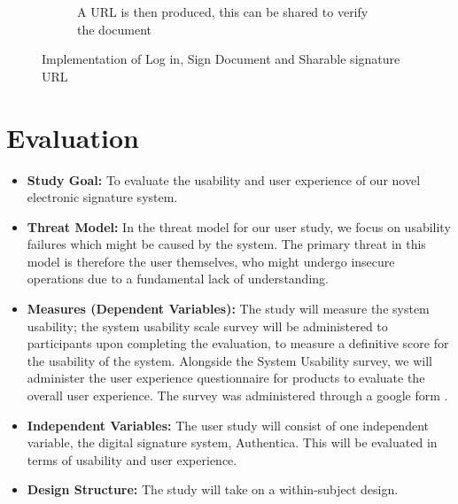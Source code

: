 \documentclass[a4,12pt]{article}
\begin{document}
\begin{figure}[htb]
\begin{subfigure}[b]{0.3\textwidth}
        \caption{A URL is then produced, this can be shared to verify the document}
    \end{subfigure}
    \caption{Implementation of Log in, Sign Document and Sharable signature URL}
    \label{fig:model}
\end{figure}


\section*{Evaluation}

\begin{itemize}[leftmargin=*, label={}]

\setlength\itemsep{0em}

\item \textbf{Study Goal:} To evaluate the usability and user experience of our novel electronic signature system.

\item \textbf{Threat Model:} In the threat model for our user study, we focus on usability failures which might be caused by the system. The primary threat in this model is therefore the user themselves, who might undergo insecure operations due to a fundamental lack of understanding.

\item \textbf{Measures (Dependent Variables):} The study will measure the system usability; the system usability scale survey will be administered to participants upon completing the evaluation, to measure a definitive score for the usability of the system. Alongside the System Usability survey, we will administer the user experience questionnaire for products to evaluate the overall user experience. The survey was administered through a google form \cite{gform}. %

\item \textbf{Independent Variables:} The user study will consist of one independent variable, the digital signature system, Authentica. This will be evaluated in terms of usability and user experience.

\item \textbf{Design Structure:} The study will take on a within-subject design.


\end{itemize}
\end{document}
